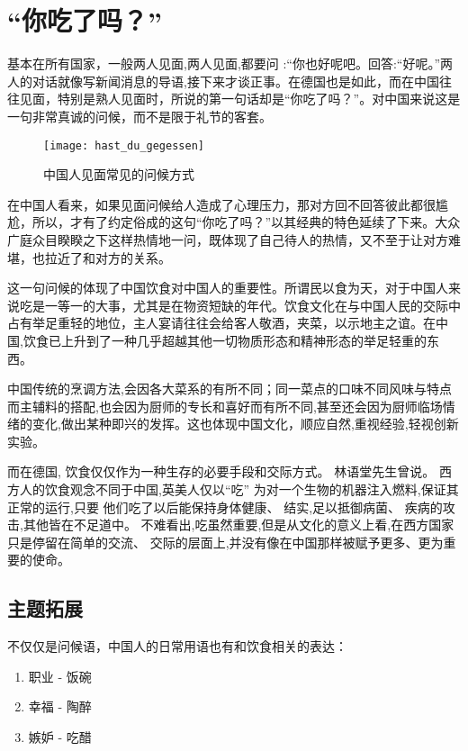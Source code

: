 \section{“你吃了吗？”}
基本在所有国家，一般两人见面,两人见面,都要问 :“你也好呢吧。回答:“好呢。”两人的对话就像写新闻消息的导语,接下来才谈正事。在德国也是如此，而在中国往往见面，特别是熟人见面时，所说的第一句话却是“你吃了吗？”。对中国来说这是一句非常真诚的问候，而不是限于礼节的客套。

\begin{figure}
    \centering
    \texttt{[image: hast\_du\_gegessen]}
    \caption{中国人见面常见的问候方式}
\end{figure}
在中国人看来，如果见面问候给人造成了心理压力，那对方回不回答彼此都很尴尬，所以，才有了约定俗成的这句“你吃了吗？”以其经典的特色延续了下来。大众广庭众目睽睽之下这样热情地一问，既体现了自己待人的热情，又不至于让对方难堪，也拉近了和对方的关系。

这一句问候的体现了中国饮食对中国人的重要性。所谓民以食为天，对于中国人来说吃是一等一的大事，尤其是在物资短缺的年代。饮食文化在与中国人民的交际中占有举足重轻的地位，主人宴请往往会给客人敬酒，夹菜，以示地主之谊。在中国,饮食已上升到了一种几乎超越其他一切物质形态和精神形态的举足轻重的东西。

中国传统的烹调方法,会因各大菜系的有所不同；同一菜点的口味不同风味与特点而主辅料的搭配,也会因为厨师的专长和喜好而有所不同,甚至还会因为厨师临场情绪的变化,做出某种即兴的发挥。这也体现中国文化，顺应自然,重视经验,轻视创新实验。

而在德国, 饮食仅仅作为一种生存的必要手段和交际方式。 林语堂先生曾说。 西方人的饮食观念不同于中国,英美人仅以“吃” 为对一个生物的机器注入燃料,保证其正常的运行,只要 他们吃了以后能保持身体健康、 结实,足以抵御病菌、 疾病的攻击,其他皆在不足道中。 不难看出,吃虽然重要,但是从文化的意义上看,在西方国家只是停留在简单的交流、 交际的层面上,并没有像在中国那样被赋予更多、更为重要的使命。

\subsection{ 主题拓展}
不仅仅是问候语，中国人的日常用语也有和饮食相关的表达：
\begin{enumerate}
\item 
职业 - 饭碗
\item
 幸福 - 陶醉
\item
 嫉妒 - 吃醋
\end{enumerate}